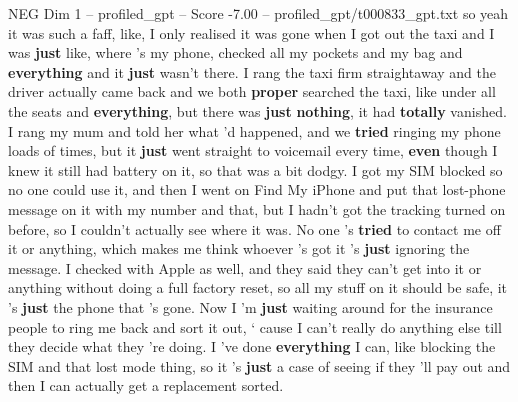 \begin{textsample}{NEG Dim 1 – profiled\_gpt – Score -7.00 – profiled\_gpt/t000833\_gpt.txt}  \label{ex:f1_neg_010}
so yeah it was such a faff, like, I only realised it was gone when I got out the taxi and I was \textbf{just} like, where ’s my phone, checked all my pockets and my bag and \textbf{everything} and it \textbf{just} wasn't there.
I rang the taxi firm straightaway and the driver actually came back and we both \textbf{proper} searched the taxi, like under all the seats and \textbf{everything}, but there was \textbf{just} \textbf{nothing}, it had \textbf{totally} vanished.
I rang my mum and told her what ’d happened, and we \textbf{tried} ringing my phone loads of times, but it \textbf{just} went straight to voicemail every time, \textbf{even} though I knew it still had battery on it, so that was a bit dodgy.
I got my SIM blocked so no one could use it, and then I went on Find My iPhone and put that lost-phone message on it with my number and that, but I hadn't got the tracking turned on before, so I couldn't actually see where it was.
No one ’s \textbf{tried} to contact me off it or anything, which makes me think whoever ’s got it ’s \textbf{just} ignoring the message.
I checked with Apple as well, and they said they can't get into it or anything without doing a full factory reset, so all my stuff on it should be safe, it ’s \textbf{just} the phone that ’s gone.
Now I ’m \textbf{just} waiting around for the insurance people to ring me back and sort it out, ‘ cause I can't really do anything else till they decide what they ’re doing.
I ’ve done \textbf{everything} I can, like blocking the SIM and that lost mode thing, so it ’s \textbf{just} a case of seeing if they ’ll pay out and then I can actually get a replacement sorted.

\end{textsample}
